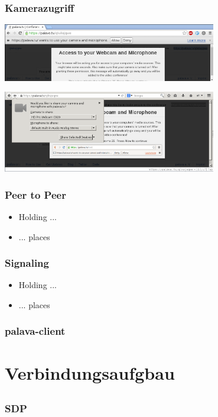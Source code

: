 \documentclass[12pt]{beamer}
\makeatletter
\newcommand{\miniscule}{\@setfontsize\miniscule{5}{6}}%
\makeatother
\begin{document}
\begin{frame}
  \frametitle{Kamerazugriff}
  \pause
  \centerline{\includegraphics[width=0.7\textwidth]{img/access_chrome.png}}
  \hspace{1cm}
  \centerline{\includegraphics[width=0.7\textwidth]{img/access_firefox.png}}
\end{frame}

\begin{frame}
  \frametitle{Peer to Peer}
  \begin{itemize}
    \item Holding ...
    \item ... places
  \end{itemize}
\end{frame}

\begin{frame}
  \frametitle{Signaling}
  \begin{itemize}
    \item Holding ...
    \item ... places
  \end{itemize}
\end{frame}

\begin{frame}
  \frametitle{palava-client}
  \pause
  
\end{frame}


\section{Verbindungsaufgbau}
\subsection{} 

\begin{frame}
  \frametitle{SDP}
  \pause
  \begin{multicols}{2}
    
  \end{multicols}
\end{frame}
\end{document}
